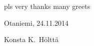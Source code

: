 pls very thanks many greets

\vspace{5cm}
Otaniemi, 24.11.2014

\vspace{5mm}
{\hfill Konsta K.\ Hölttä \hspace{1cm}}
